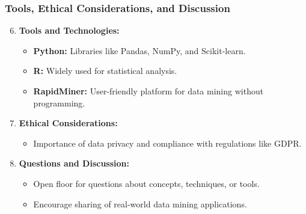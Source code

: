 \documentclass[aspectratio=169]{beamer}
\begin{document}
\begin{frame}[fragile]
    \frametitle{Tools, Ethical Considerations, and Discussion}
    
    \begin{enumerate}
        \setcounter{enumi}{5} %
        \item \textbf{Tools and Technologies:}
        \begin{itemize}
            \item \textbf{Python:} Libraries like Pandas, NumPy, and Scikit-learn.
            \item \textbf{R:} Widely used for statistical analysis.
            \item \textbf{RapidMiner:} User-friendly platform for data mining without programming.
        \end{itemize}
        
        \item \textbf{Ethical Considerations:}
        \begin{itemize}
            \item Importance of data privacy and compliance with regulations like GDPR.
        \end{itemize}
        
        \item \textbf{Questions and Discussion:}
        \begin{itemize}
            \item Open floor for questions about concepts, techniques, or tools.
            \item Encourage sharing of real-world data mining applications.
        \end{itemize}
    \end{enumerate}
\end{frame}
\end{document}
